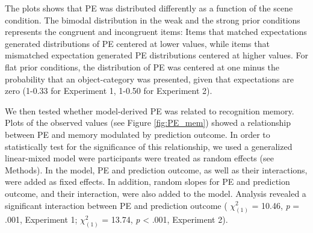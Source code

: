 \documentclass[a4paper,12pt]{article} 			%
\begin{document}
The plots shows that PE was distributed differently as a function of the scene condition. The bimodal distribution in the weak and the strong prior conditions represents the congruent and incongruent items: Items that matched expectations generated distributions of PE centered at lower values, while items that mismatched expectation generated PE distributions centered at higher values. For flat prior conditions, the distribution of PE was centered at one minus the probability that an object-category was presented, given that expectations are zero (1-0.33 for Experiment 1, 1-0.50 for Experiment 2). \par
We then tested whether model-derived PE was related to recognition memory. Plots of the observed values (see Figure \ref{fig:PE_mem}) showed a relationship between PE and memory modulated by prediction outcome. In order to statistically test for the significance of this relationship, we used a generalized linear-mixed model were participants were treated as random effects (see Methods). In the model, PE and prediction outcome, as well as their interactions, were added as fixed effects. In addition, random slopes for PE and prediction outcome, and their interaction, were also added to the model. Analysis revealed a significant interaction between PE and prediction outcome ( $\chi^2_{(1)}$ = 10.46, \textit{p} = .001, Experiment 1;  $\chi^2_{(1)}$ = 13.74, \textit{p} < .001, Experiment 2).
\end{document}
